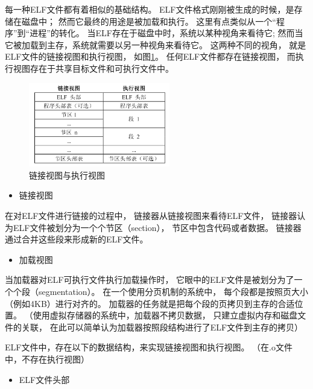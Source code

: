 每一种ELF文件都有着相似的基础结构。
ELF文件格式刚刚被生成的时候，是存储在磁盘中；
然而它最终的用途是被加载和执行。
这里有点类似从一个“程序”到“进程”的转化。
当ELF存在于磁盘中时，系统以某种视角来看待它;
然而当它被加载到主存，系统就需要以另一种视角来看待它。
这两种不同的视角，
就是ELF文件的链接视图和执行视图，
如图\ref{elf-map}。
任何ELF文件都存在链接视图，
而执行视图存在于共享目标文件和可执行文件中。

\begin{figure}[h!]
  \centering
  \includegraphics[width=0.55\textwidth]{figure/elf-map.png}
  \caption{链接视图与执行视图}
  \label{elf-map}
\end{figure}

\begin{itemize}
  \item 链接视图
\end{itemize}

在对ELF文件进行链接的过程中，
链接器从链接视图来看待ELF文件，
链接器认为ELF文件被划分为一个个节区（section），
节区中包含代码或者数据。
链接器通过合并这些段来形成新的ELF文件。

\begin{itemize}
  \item 加载视图
\end{itemize}

当加载器对ELF可执行文件执行加载操作时，
它眼中的ELF文件是被划分为了一个个段（segmentation）。
在一个使用分页机制的系统中，
每个段都是按照页大小（例如4KB）进行对齐的。
加载器的任务就是把每个段的页拷贝到主存的合适位置。
（使用虚拟存储器的系统中，加载器不拷贝数据，
只建立虚拟内存和磁盘文件的关联，
在此可以简单认为加载器按照段结构进行了ELF文件到主存的拷贝）

ELF文件中，存在以下的数据结构，来实现链接视图和执行视图。
（在.o文件中，不存在执行视图）


\begin{itemize}
  \item ELF文件头部
\end{itemize}

